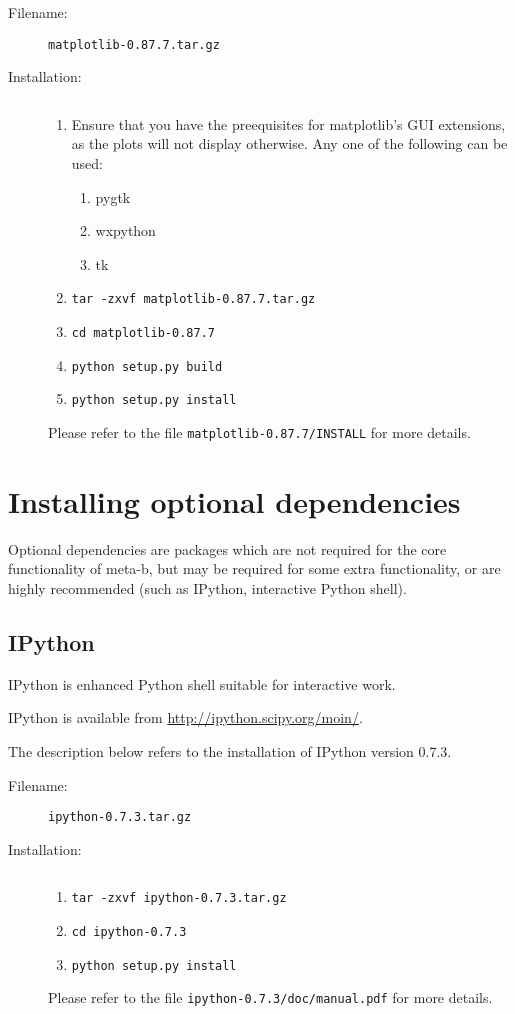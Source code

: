 \begin{description}
\item [Filename:] {\tt matplotlib-0.87.7.tar.gz}
\item [Installation:] $ $
  \begin{enumerate}
  \item Ensure that you have the preequisites for matplotlib's GUI
        extensions, as the plots will not display otherwise. Any one of
        the following can be used:
        \begin{enumerate}
        \item pygtk
        \item wxpython
        \item tk
        \end{enumerate}
  \item {\tt tar -zxvf matplotlib-0.87.7.tar.gz}
  \item {\tt cd matplotlib-0.87.7}
  \item {\tt python setup.py build}
  \item {\tt python setup.py install}
  \end{enumerate}
Please refer to the file {\tt matplotlib-0.87.7/INSTALL} for more
details.
\end{description}

\section{Installing optional dependencies}

Optional dependencies are packages which are not required for the
core functionality of meta-b, but may be required for some extra
functionality, or are highly recommended (such as IPython, interactive
Python shell). 

\subsection{IPython}

IPython is enhanced Python shell suitable for interactive work.

IPython is available from \url{http://ipython.scipy.org/moin/}.

The description below refers to the installation of IPython version
0.7.3.

\begin{description}
\item [Filename:] {\tt ipython-0.7.3.tar.gz}
\item [Installation:] $ $
  \begin{enumerate}
  \item {\tt tar -zxvf ipython-0.7.3.tar.gz}
  \item {\tt cd ipython-0.7.3}
  \item {\tt python setup.py install}
  \end{enumerate}
Please refer to the file {\tt ipython-0.7.3/doc/manual.pdf} for more
details.
\end{description}

